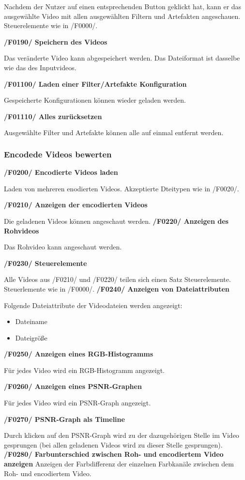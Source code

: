 \documentclass[parskip=full]{scrartcl}
\begin{document}
Nachdem der Nutzer auf einen entsprechenden Button geklickt hat, kann er das ausgewählte Video mit allen ausgewählten Filtern und Artefakten angeschauen. Steuerelemente wie in /F0000/.

\textbf{/F0190/ Speichern des Videos}

Das veränderte Video kann abgespeichert werden. Das Dateiformat ist dasselbe wie das des Inputvideos.

\textbf{/F01100/ Laden einer Filter/Artefakte Konfiguration}

Gespeicherte Konfigurationen können wieder geladen werden.

\textbf{/F01110/ Alles zurücksetzen}

Ausgewählte Filter und Artefakte können alle auf einmal entfernt werden.
\subsubsection{Encodede Videos bewerten}
\textbf{/F0200/ Encodierte Videos laden}

Laden von mehreren enodierten Videos. Akzeptierte Dteitypen wie in /F0020/.

\textbf{/F0210/ Anzeigen der encodierten Videos}

Die geladenen Videos können angeschaut werden.
\textbf{/F0220/ Anzeigen des Rohvideos}

Das Rohvideo kann angeschaut werden.

\textbf{/F0230/ Steuerelemente}

Alle Videos aus /F0210/ und /F0220/ teilen sich einen Satz Steuerelemente. Steuerlemente wie in /F0000/.
\newpage
\textbf{/F0240/ Anzeigen von Dateiattributen}

Folgende Dateiattribute der Videodateien werden angezeigt:
\begin{itemize}
\item Dateiname
\item Dateigröße
\end{itemize}

\textbf{/F0250/ Anzeigen eines RGB-Histogramms}

Für jedes Video wird ein RGB-Histogramm angezeigt.

\textbf{/F0260/ Anzeigen eines PSNR-Graphen}

Für jedes Video wird ein PSNR-Graph angezeigt.

\textbf{/F0270/ PSNR-Graph als Timeline}

Durch klicken auf den PSNR-Graph wird zu der dazugehörigen Stelle im Video gesprungen (bei allen geladenen Videos wird zu dieser Stelle gesprungen).
\textbf{/F0280/ Farbunterschied zwischen Roh- und encodiertem Video anzeigen}
Anzeigen der Farbdifferenz der einzelnen Farbkanäle zwischen dem Roh- und encodiertem Video.
\end{document}
